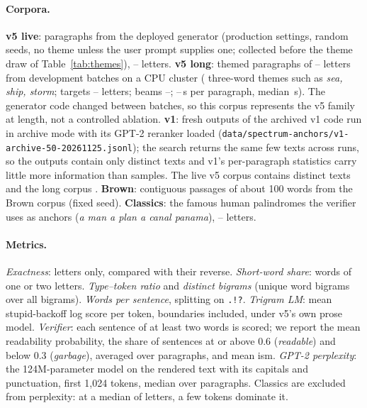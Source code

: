 \documentclass[11pt]{article}
\newcommand{\code}[1]{\texttt{#1}}
\newcommand{\w}[1]{\emph{#1}}
\begin{document}
\paragraph{Corpora.} \textbf{v5 live}: \vFiveLiveN{} paragraphs from the deployed generator (production settings, random seeds, no theme unless the user prompt supplies one; collected before the theme draw of Table~\ref{tab:themes}), \vFiveLiveLettersMin--\vFiveLiveLettersMax{} letters. \textbf{v5 long}: \vFiveSophiaN{} themed paragraphs of \vFiveSophiaLettersMin--\vFiveSophiaLettersMax{} letters from \longBatches{} development batches on a CPU cluster (\longThemes{} three-word themes such as \w{sea, ship, storm}; targets \longTargetMin--\longTargetMax{} letters; beams \longBeamMin--\longBeamMax; \longSecsMin--\longSecsMax{}\,s per paragraph, median \longSecsMed{}\,s). The generator code changed between batches, so this corpus represents the v5 family at length, not a controlled ablation. \textbf{v1}: \vOneN{} fresh outputs of the archived v1 code run in archive mode with its GPT-2 reranker loaded (\nolinkurl{data/spectrum-anchors/v1-archive-50-20261125.jsonl}); the search returns the same few texts across runs, so the \vOneN{} outputs contain only \vOneDistinct{} distinct texts and v1's per-paragraph statistics carry little more information than \vOneDistinct{} samples. The live v5 corpus contains \vFiveLiveDistinct{} distinct texts and the long corpus \vFiveSophiaDistinct. \textbf{Brown}: \BrownN{} contiguous passages of about 100 words from the Brown corpus (fixed seed). \textbf{Classics}: the \ClassicsN{} famous human palindromes the verifier uses as anchors (\w{a man a plan a canal panama}), \ClassicsLettersMin--\ClassicsLettersMax{} letters.

\paragraph{Metrics.} \emph{Exactness}: letters only, compared with their reverse. \emph{Short-word share}: words of one or two letters. \emph{Type--token ratio} and \emph{distinct bigrams} (unique word bigrams over all bigrams). \emph{Words per sentence}, splitting on \code{.!?}. \emph{Trigram LM}: mean stupid-backoff log score per token, boundaries included, under v5's own prose model. \emph{Verifier}: each sentence of at least two words is scored; we report the mean readability probability, the share of sentences at or above 0.6 (\emph{readable}) and below 0.3 (\emph{garbage}), averaged over paragraphs, and mean ism. \emph{GPT-2 perplexity}: the 124M-parameter model on the rendered text with its capitals and punctuation, first 1,024 tokens, median over paragraphs. Classics are excluded from perplexity: at a median of \ClassicsLettersMed{} letters, a few tokens dominate it.
\end{document}
